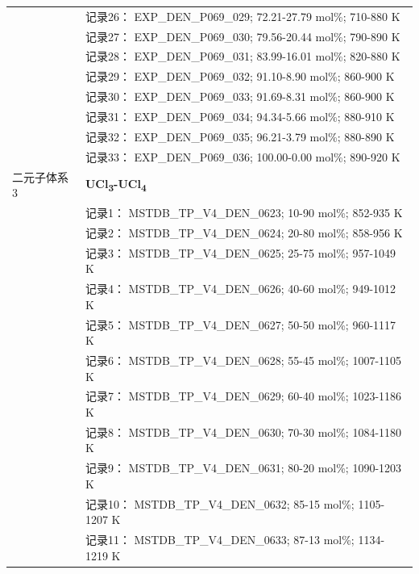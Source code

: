 \documentclass[12pt]{article}
\begin{document}
{\begin{longtable}[]{@{}
  >{\raggedright\arraybackslash}p{}
  >{\raggedright\arraybackslash}p{}@{}}
 & 记录26： EXP\_DEN\_P069\_029; 72.21-27.79 mol\%; 710-880 K \\
 & 记录27： EXP\_DEN\_P069\_030; 79.56-20.44 mol\%; 790-890 K \\
 & 记录28： EXP\_DEN\_P069\_031; 83.99-16.01 mol\%; 820-880 K \\
 & 记录29： EXP\_DEN\_P069\_032; 91.10-8.90 mol\%; 860-900 K \\
 & 记录30： EXP\_DEN\_P069\_033; 91.69-8.31 mol\%; 860-900 K \\
 & 记录31： EXP\_DEN\_P069\_034; 94.34-5.66 mol\%; 880-910 K \\
 & 记录32： EXP\_DEN\_P069\_035; 96.21-3.79 mol\%; 880-890 K \\
 & 记录33： EXP\_DEN\_P069\_036; 100.00-0.00 mol\%; 890-920 K  \\

二元子体系 3  & \textbf{UCl\textsubscript{3}-UCl\textsubscript{4}} \\
 & 记录1： MSTDB\_TP\_V4\_DEN\_0623; 10-90 mol\%; 852-935 K \\
 & 记录2： MSTDB\_TP\_V4\_DEN\_0624; 20-80 mol\%; 858-956 K \\
 & 记录3： MSTDB\_TP\_V4\_DEN\_0625; 25-75 mol\%; 957-1049 K \\
 & 记录4： MSTDB\_TP\_V4\_DEN\_0626; 40-60 mol\%; 949-1012 K \\
 & 记录5： MSTDB\_TP\_V4\_DEN\_0627; 50-50 mol\%; 960-1117 K \\
 & 记录6： MSTDB\_TP\_V4\_DEN\_0628; 55-45 mol\%; 1007-1105 K \\
 & 记录7： MSTDB\_TP\_V4\_DEN\_0629; 60-40 mol\%; 1023-1186 K \\
 & 记录8： MSTDB\_TP\_V4\_DEN\_0630; 70-30 mol\%; 1084-1180 K \\
 & 记录9： MSTDB\_TP\_V4\_DEN\_0631; 80-20 mol\%; 1090-1203 K \\
 & 记录10： MSTDB\_TP\_V4\_DEN\_0632; 85-15 mol\%; 1105-1207 K \\
 & 记录11： MSTDB\_TP\_V4\_DEN\_0633; 87-13 mol\%; 1134-1219 K  \\


\end{longtable}}
\end{document}
